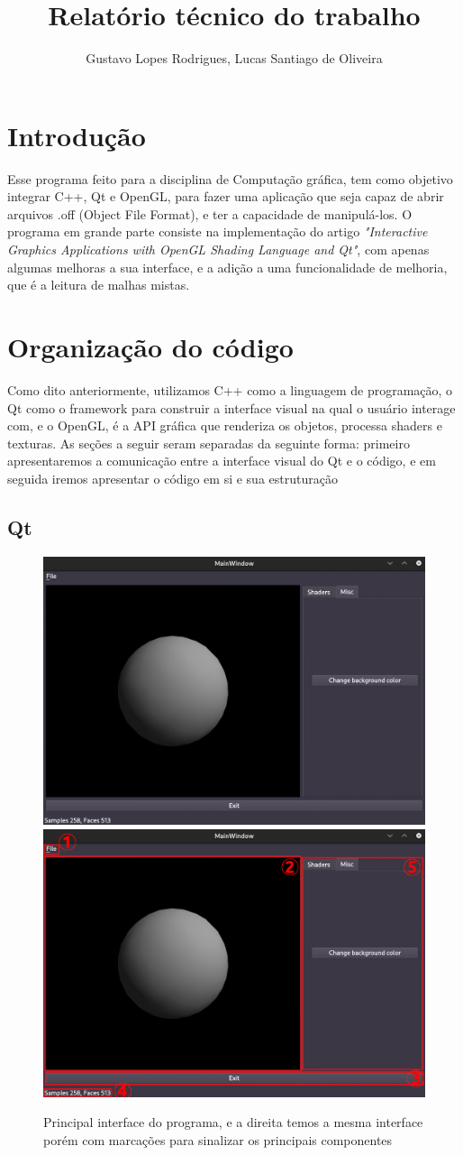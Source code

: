 \documentclass{ol-softwaremanual}
\title{Relatório técnico do trabalho }
\author{Gustavo Lopes Rodrigues, Lucas Santiago de Oliveira}
\begin{document}
\maketitle

\tableofcontents
\newpage

\section{Introdução}

Esse programa feito para a disciplina de Computação gráfica, tem como objetivo integrar
C++, Qt e OpenGL, para fazer uma aplicação que seja capaz de abrir arquivos .off (Object File Format),
e ter a capacidade de manipulá-los. O programa em grande parte consiste na implementação do artigo 
\emph{"Interactive Graphics Applications with OpenGL Shading Language and Qt"}, com apenas algumas 
melhoras a sua interface, e a adição a uma funcionalidade de melhoria, que é a leitura de malhas
mistas.

\section{Organização do código}

Como dito anteriormente, utilizamos C++ como a linguagem de programação, o Qt como o framework para 
construir a interface visual na qual o usuário interage com, e o OpenGL, é a API gráfica que renderiza
os objetos, processa shaders e texturas. As seções a seguir seram separadas da seguinte forma: primeiro
apresentaremos a comunicação entre a interface visual do Qt e o código, e em seguida iremos apresentar o código 
em si e sua estruturação 

\subsection{Qt}

\begin{figure}[ht]
    \centering
    \includegraphics[width=.4\textwidth]{Interface.jpg}
    \includegraphics[width=.4\textwidth]{Interfacemarcada.jpg}
    \caption{Principal interface do programa, e a direita temos a mesma interface porém
    com marcações para sinalizar os principais componentes}
\end{figure}
\end{document}
